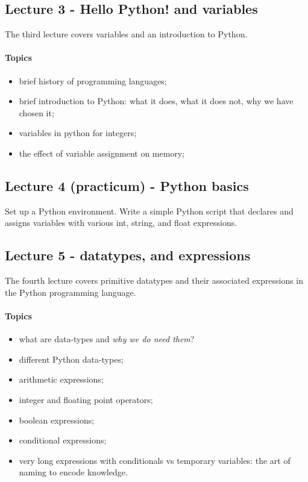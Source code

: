 \documentclass[12pt,a4paper,final]{article}
\begin{document}
\subsection{Lecture 3 - Hello Python! and variables}
The third lecture covers variables and an introduction to Python.

\paragraph*{Topics}
\begin{itemize}
\item brief history of programming languages;
\item brief introduction to Python: what it does, what it does not, why we have chosen it;
\item variables in python for integers;
\item the effect of variable assignment on memory;
\end{itemize}

\subsection{Lecture 4 (practicum) - Python basics}
Set up a Python environment. Write a simple Python script that declares and assigns variables with various int, string, and float expressions.

\subsection{Lecture 5 - datatypes, and expressions}
The fourth lecture covers primitive datatypes and their associated expressions in the Python programming language.

\paragraph*{Topics}
\begin{itemize}
\item what are data-types and \textit{why we do need them}?
\item different Python data-types;
\item arithmetic expressions;
\item integer and floating point operators;
\item boolean expressions;
\item conditional expressions;
\item very long expressions with conditionals vs temporary variables: the art of naming to encode knowledge.
\end{itemize}
\end{document}
